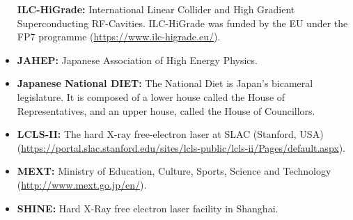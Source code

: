 \documentclass[%
reprint,
 floatfix,
 amsmath,amssymb,
 aps,
]{revtex4-1}
\begin{document}
\begin{itemize}
\textbf{ILC-HiGrade:} International Linear Collider and High Gradient Superconducting RF-Cavities. ILC-HiGrade was funded by the EU under the FP7 programme (\url{https://www.ilc-higrade.eu/}).
\item
\textbf{JAHEP:} Japanese Association of High Energy Physics.
\item
\textbf{Japanese National DIET:} The National Diet is Japan's bicameral legislature. It is composed of a lower house called the House of Representatives, and an upper house, called the House of Councillors.
\item
\textbf{LCLS-II:}  The hard X-ray free-electron laser at SLAC (Stanford, USA)(\url{https://portal.slac.stanford.edu/sites/lcls-public/lcls-ii/Pages/default.aspx}).
\item
\textbf{MEXT:} Ministry of Education, Culture, Sports, Science and Technology (\url{http://www.mext.go.jp/en/}).
\item
\textbf{SHINE:} Hard X-Ray free electron laser facility in Shanghai.

\end{itemize}
\end{document}
